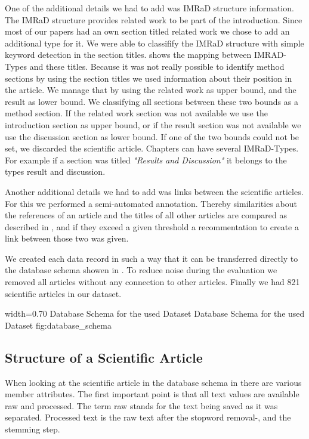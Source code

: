 One of the additional details we had to add was IMRaD structure information. The IMRaD structure provides related work to be part of the introduction. Since most of our papers had an own section titled related work we chose to add an additional type for it. We were able to classifify the IMRaD structure with simple keyword detection in the section titles.  shows the mapping between IMRAD-Types and these titles. Because it was not really possible to identify method sections by using the section titles we used information about their position in the article. We manage that by using the related work as upper bound, and the result as lower bound. We classifying all sections between these two bounds as a method section. If the related work section was not available we use the introduction section as upper bound, or if the result section was not available we use the discussion section as lower bound. If one of the two bounds could not be set, we discarded the scientific article. Chapters can have several IMRaD-Types. For example if a section was titled \textit{"Results and Discussion"} it belongs to the types result and discussion.

Another additional details we had to add was links between the scientific articles. For this we performed a semi-automated annotation. Thereby similarities about the references of an article and the titles of all other articles are compared as described in , and if they exceed a given threshold a recommentation to create a link between those two was given.

We created each data record in such a way that it can be transferred directly to the database schema showen in . To reduce noise during the evaluation we removed all articles without any connection to other articles. Finally we had 821 scientific articles in our dataset.

      {width=0.70\textwidth}
      {Database Schema for the used Dataset}
      {Database Schema for the used Dataset}
      {fig:database_schema}

\subsection{Structure of a Scientific Article}
\label{sec:structure_scientific_article}

When looking at the scientific article in the database schema in  there are various member attributes. The first important point is that all text values are available raw and processed. The term raw stands for the text being saved as it was separated. Processed text is the raw text after the stopword removal-, and the stemming step.

